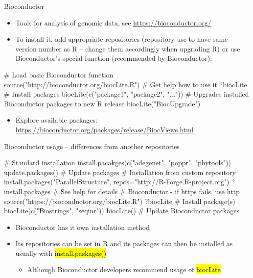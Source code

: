 \documentclass[compress, ucs, xelatex, 11pt, xcolor=svgnames,
  hyperref={
    bookmarks=true,
    unicode=true,
    colorlinks=true,
    pdftitle={Molecular data in R},
    plainpages=false,
    pdfauthor={Vojtech Zeisek},
    pdfsubject={Course about phylogeny and evolution in R},
    pdfcreator={XeLaTeX},
    pdfkeywords={R, evolution, phylogeny, molecular data},
    linkcolor=Tomato,
    anchorcolor=SaddleBrown,
    citecolor=Goldenrod,
    filecolor=DarkMagenta,
    menucolor=Sienna,
    urlcolor=DarkTurquoise,
    pdftex},
  url={hyphens, lowtilde} %
  ]{beamer}
\renewcommand{\texttt}[1]{\hl{\ttfamily #1}}
\begin{document}
\begin{frame}[fragile]{Bioconductor}
\begin{itemize}
 \item Tools for analysis of genomic data, see \url{https://bioconductor.org/}
 \item To install it, add appropriate repositories (repository use to have same version number as R -- change them accordingly when upgrading R) or use Bioconductor's special function (recommended by Bioconductor):
\end{itemize}
  \begin{spluscode}
    # Load basic Bioconductor function
    source("http://bioconductor.org/biocLite.R")
    # Get help how to use it
    ?biocLite
    # Install packages
    biocLite(c("package1", "package2", "..."))
    # Upgrades installed Bioconductor packages to new R release
    biocLite("BiocUpgrade")
  \end{spluscode}
\begin{itemize}
 \item Explore available packages: \url{https://bioconductor.org/packages/release/BiocViews.html}
\end{itemize}
\end{frame}

\begin{frame}[fragile]{Bioconductor usage -- differences from another repositories}
  \begin{spluscode}
    # Standard installation
    install.pacakges(c("adegenet", "poppr", "phytools"))
    update.packages() # Update packages
    # Installation from custom repository
    install.packages("ParallelStructure",
      repos="http://R-Forge.R-project.org")
    ?install.packages # See help for details
    # Bioconductor - if https fails, use http
    source("https://bioconductor.org/biocLite.R")
    ?biocLite
    # Install package(s)
    biocLite(c("Biostrings", "seqinr"))
    biocLite() # Update Bioconductor packages
  \end{spluscode}
  \begin{itemize}
    \item Bioconductor has it own installation method
    \item Its repositories can be set in R and its packages can then be installed as usually with \texttt{install.paskages()}
    \begin{itemize}
      \item Although Bioconductor developers recommend usage of \texttt{biocLite}
    \end{itemize}
  \end{itemize}
\end{frame}
\end{document}
